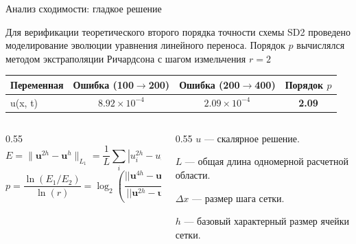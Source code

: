 \documentclass[ignoreonframetext,unicode,aspectratio=169]{beamer}
\begin{document}
	\begin{frame}{Анализ сходимости: гладкое решение}
		\begin{block}{}
			Для верификации теоретического второго порядка точности схемы SD2 проведено моделирование эволюции уравнения линейного переноса.
			Порядок $p$ вычислялся методом экстраполяции Ричардсона с шагом измельчения $r=2$
		\end{block}
		
		\begin{table}[h]
			\centering
			\footnotesize
			\renewcommand{\arraystretch}{1.3}
			\begin{tabular}{lccc}
				\hline
				\textbf{Переменная} & \textbf{Ошибка (100$\to$200)} & \textbf{Ошибка (200$\to$400)} & \textbf{Порядок $p$} \\
				\hline
				u(x, t) & $8.92 \times 10^{-4}$ & $2.09 \times 10^{-4}$ & \textbf{2.09} \\
				\hline
			\end{tabular}
		\end{table}
		
		\begin{columns}[c]
			\begin{column}{0.55\textwidth}
				\[
				E = \|\mathbf{u}^{2h} - \mathbf{u}^{h}\|_{L_1} = \frac{1}{L} \sum_i |u_i^{2h} - u_i^h| \cdot \Delta x
				\]
				\[
				p = \frac{\ln(E_1 / E_2)}{\ln(r)} = \log_2 \left( \frac{|| \mathbf{u}^{4h} - \mathbf{u}^{2h} ||_{L_1}}{|| \mathbf{u}^{2h} - \mathbf{u}^{h} ||_{L_1}} \right)
				\]
			\end{column}
			\begin{column}{0.55\textwidth}
				$u$ --- скалярное решение.
				
				$L$ --- общая длина одномерной расчетной области.
				
				$\Delta x$ --- размер шага сетки.
				
				$h$ --- базовый характерный размер ячейки сетки.
			\end{column}
		\end{columns}
		
%				
%			
		
	\end{frame}
	
\end{document}
